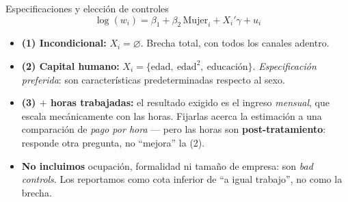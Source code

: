 \documentclass[aspectratio=169]{beamer}
\begin{document}
\begin{frame}{Especificaciones y elección de controles}
  \[
    \log(w_i) = \beta_1 + \beta_2\,\text{Mujer}_i + X_i'\gamma + u_i
  \]
  \vspace{-0.4em}
  \begin{itemize}
    \item \textbf{(1) Incondicional:} $X_i = \varnothing$. Brecha total, con todos
      los canales adentro.
    \item \textbf{(2) Capital humano:} $X_i = \{\text{edad},\ \text{edad}^2,\
      \text{educación}\}$. \emph{Especificación preferida}: son características
      predeterminadas respecto al sexo.
    \item \textbf{(3) $+$ horas trabajadas:} el resultado exigido es el ingreso
      \emph{mensual}, que escala mecánicamente con las horas. Fijarlas acerca la
      estimación a una comparación de \emph{pago por hora} ---
      pero las horas son \textbf{post-tratamiento}: responde otra pregunta, no
      ``mejora'' la (2).
    \item \textbf{No incluimos} ocupación, formalidad ni tamaño de empresa: son
      \emph{bad controls}. Los reportamos como cota inferior de ``a igual
      trabajo'', no como la brecha.
  \end{itemize}
\end{frame}
\end{document}
